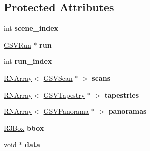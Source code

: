 \subsection*{Protected Attributes}
\begin{DoxyCompactItemize}
\item 
int {\bfseries scene\+\_\+index}\hypertarget{class_g_s_v_segment_aaee1fee327b1af9a990a79a694c4bc0a}{}\label{class_g_s_v_segment_aaee1fee327b1af9a990a79a694c4bc0a}

\item 
\hyperlink{class_g_s_v_run}{G\+S\+V\+Run} $\ast$ {\bfseries run}\hypertarget{class_g_s_v_segment_af81772f93c100f506fc878195a5cad39}{}\label{class_g_s_v_segment_af81772f93c100f506fc878195a5cad39}

\item 
int {\bfseries run\+\_\+index}\hypertarget{class_g_s_v_segment_aca0f6263b574ef08ca9b638c338ec51b}{}\label{class_g_s_v_segment_aca0f6263b574ef08ca9b638c338ec51b}

\item 
\hyperlink{class_r_n_array}{R\+N\+Array}$<$ \hyperlink{class_g_s_v_scan}{G\+S\+V\+Scan} $\ast$ $>$ {\bfseries scans}\hypertarget{class_g_s_v_segment_ab8690bbf81ba507fd8b1f6d6ce76d165}{}\label{class_g_s_v_segment_ab8690bbf81ba507fd8b1f6d6ce76d165}

\item 
\hyperlink{class_r_n_array}{R\+N\+Array}$<$ \hyperlink{class_g_s_v_tapestry}{G\+S\+V\+Tapestry} $\ast$ $>$ {\bfseries tapestries}\hypertarget{class_g_s_v_segment_a21a637648f85d403ba56e9b2041060a1}{}\label{class_g_s_v_segment_a21a637648f85d403ba56e9b2041060a1}

\item 
\hyperlink{class_r_n_array}{R\+N\+Array}$<$ \hyperlink{class_g_s_v_panorama}{G\+S\+V\+Panorama} $\ast$ $>$ {\bfseries panoramas}\hypertarget{class_g_s_v_segment_adade17be0952a1847acedc7e22c0223f}{}\label{class_g_s_v_segment_adade17be0952a1847acedc7e22c0223f}

\item 
\hyperlink{class_r3_box}{R3\+Box} {\bfseries bbox}\hypertarget{class_g_s_v_segment_a18c1e73eed5870df8694fd9bf5ae7758}{}\label{class_g_s_v_segment_a18c1e73eed5870df8694fd9bf5ae7758}

\item 
void $\ast$ {\bfseries data}\hypertarget{class_g_s_v_segment_aeaf30bd003e946fb7603d1b3865f5cc5}{}\label{class_g_s_v_segment_aeaf30bd003e946fb7603d1b3865f5cc5}

\end{DoxyCompactItemize}
